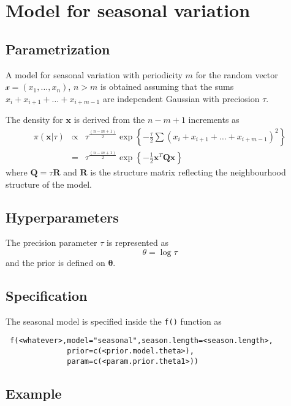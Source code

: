 \documentclass[a4paper,11pt]{article}
\begin{document}
\section*{Model for seasonal variation}

\subsection*{Parametrization}

A model for seasonal variation with periodicity $m$ for the random vector $\mathcal{x}=(x_1,\dots,x_n)$, $n>m$ is obtained assuming that the sums $x_i+x_{i+1}+\dots+x_{i+m-1}$ are independent Gaussian with preciosion $\tau$.

The density for $\mathbf{x}$ is derived from the $n-m+1$ increments as
\begin{eqnarray}
\pi(\mathbf{x}|\tau) &\propto& \tau^{\frac{(n-m+1)}{2}} \exp\left\{-\frac{\tau}{2}\sum (x_i+x_{i+1}+\dots+x_{i+m-1})^2\right\}\\
& = &\tau^{\frac{(n-m+1)}{2}}\exp\left\{-\frac{1}{2}\mathbf{x}^T\mathbf{Q}\mathbf{x} \right\}
\end{eqnarray}
where $\mathbf{Q}=\tau\mathbf{R}$ and $\mathbf{R}$ is the structure matrix reflecting the neighbourhood structure of the model.


\subsection*{Hyperparameters}

The precision parameter $\tau$ is represented as
\begin{displaymath}
    \theta =\log \tau
\end{displaymath}
and the prior is defined on $\mathbf{\theta}$. 

\subsection*{Specification}

The seasonal model is specified inside the {\tt f()} function as
\begin{verbatim}
 f(<whatever>,model="seasonal",season.length=<season.length>,
              prior=c(<prior.model.theta>),
              param=c(<param.prior.theta1>))
\end{verbatim}
 
\subsection*{Example}
\end{document}
